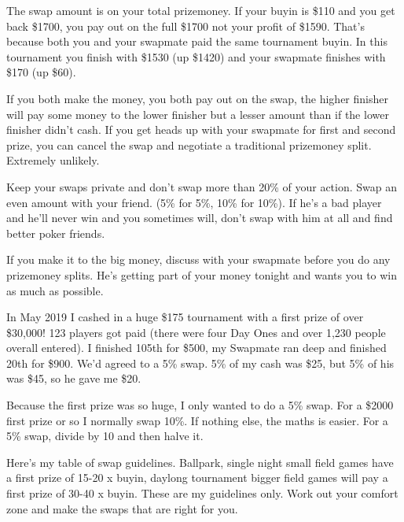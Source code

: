 The swap amount is on your total prizemoney. If your buyin is
\$110 and you get back \$1700, you pay out on the full
\$1700 not your profit of \$1590. That's because both you and your
swapmate paid the same tournament buyin.
In this tournament you finish with \$1530 (up \$1420) and your swapmate
finishes with \$170 (up \$60).

If you both make the money, you both pay out on the swap, the
higher finisher will pay some money to the lower finisher but a lesser
amount than if the lower finisher didn't cash. If you get heads up
with your swapmate for first and second prize, you can cancel the swap
and negotiate a traditional prizemoney split. Extremely unlikely.

Keep your swaps private and don't swap more than 20\% of your action.
Swap an even amount with your friend. (5\% for 5\%, 10\% for 10\%).
If he's a bad player and he'll never win and you sometimes will, don't
swap with him at all and find better poker friends.

If you make it to the big money, discuss with your swapmate before you
do any prizemoney splits. He's getting part of your money tonight and
wants you to win as much as possible.

In May 2019 I cashed in a huge \$175 tournament with a first
prize of over \$30,000! 123 players got paid (there were four Day Ones
and over 1,230 people overall entered). I finished 105th for \$500, my
Swapmate ran deep and finished 20th for \$900. We'd agreed to a 5\% swap.
5\% of my cash was \$25, but 5\% of his was \$45, so he gave me \$20.

Because the first prize was so huge, I only wanted to do a 5\% swap.
For a \$2000 first prize or so I normally swap 10\%. If nothing else,
the maths is easier. For a 5\% swap, divide by 10 and then halve it.

Here's my table of swap guidelines. Ballpark, single night small field
games have a first prize of 15-20 x buyin, daylong tournament bigger
field games will pay a first prize of 30-40 x buyin.
These are my guidelines only. Work out your comfort zone and make the
swaps that are right for you.

